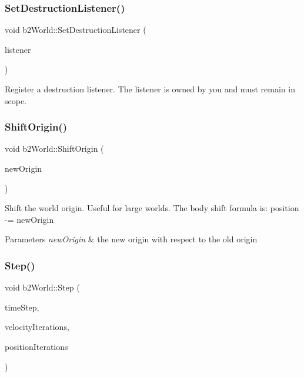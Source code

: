 \subsubsection{\texorpdfstring{Set\+Destruction\+Listener()}{SetDestructionListener()}}
{\footnotesize\ttfamily void b2\+World\+::\+Set\+Destruction\+Listener (\begin{DoxyParamCaption}\item[{\mbox{\hyperlink{classb2DestructionListener}{b2\+Destruction\+Listener}} $\ast$}]{listener }\end{DoxyParamCaption})}

Register a destruction listener. The listener is owned by you and must remain in scope. \mbox{\label{classb2World_afc33e20e64252c5be115216051408047}} 
\subsubsection{\texorpdfstring{Shift\+Origin()}{ShiftOrigin()}}
{\footnotesize\ttfamily void b2\+World\+::\+Shift\+Origin (\begin{DoxyParamCaption}\item[{const \mbox{\hyperlink{structb2Vec2}{b2\+Vec2}} \&}]{new\+Origin }\end{DoxyParamCaption})}

Shift the world origin. Useful for large worlds. The body shift formula is\+: position -\/= new\+Origin 
\begin{DoxyParams}{Parameters}
{\em new\+Origin} & the new origin with respect to the old origin \\
\hline
\end{DoxyParams}
\mbox{\label{classb2World_a7a8eff61af98461f978fe43f3af7be90}} 
\subsubsection{\texorpdfstring{Step()}{Step()}}
{\footnotesize\ttfamily void b2\+World\+::\+Step (\begin{DoxyParamCaption}\item[{float32}]{time\+Step,  }\item[{int32}]{velocity\+Iterations,  }\item[{int32}]{position\+Iterations }\end{DoxyParamCaption})}

